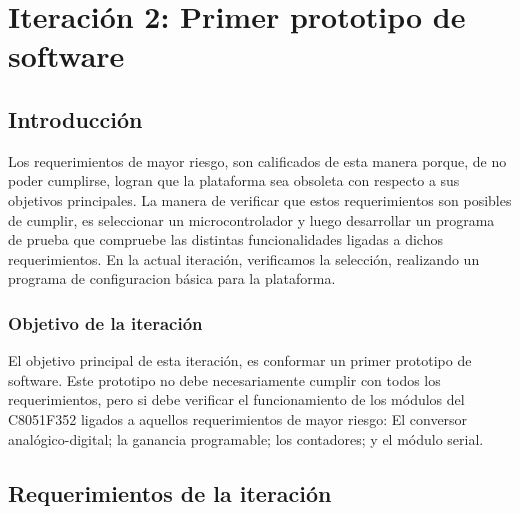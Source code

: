 \chapter{Iteración 2: Primer prototipo de software} %
\label{cha:iteracion_2}

\section{Introducción} %
\label{it2:sec:introduccion}


Los requerimientos de mayor riesgo, son calificados de esta manera porque, de no poder cumplirse, logran que la plataforma sea obsoleta con respecto a sus objetivos principales. La manera de verificar que estos requerimientos son posibles de cumplir, es seleccionar un microcontrolador y luego desarrollar un programa de prueba que compruebe las distintas funcionalidades ligadas a dichos requerimientos. En la actual iteración, verificamos la selección, realizando un programa de configuracion básica para la plataforma.

\subsection{Objetivo de la iteración} %
\label{sub:objetivo_de_la_iteracion}

El objetivo principal de esta iteración, es conformar un primer prototipo de software. Este prototipo no debe necesariamente cumplir con todos los requerimientos, pero si debe verificar el funcionamiento de los módulos del C8051F352 ligados a aquellos requerimientos de mayor riesgo: El conversor analógico-digital; la ganancia programable; los contadores; y el módulo serial.




\section{Requerimientos de la iteración} %
\label{it2:sec:requerimientos_de_la_iteracion}


